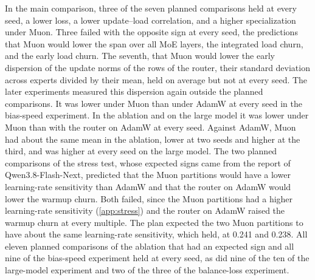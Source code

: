\documentclass[11pt, a4paper]{article}
\begin{document}
In the main comparison, three of the seven planned comparisons held at every seed, a lower loss, a lower update--load correlation, and a higher specialization under Muon. Three failed with the opposite sign at every seed, the predictions that Muon would lower the span over all MoE layers, the integrated load churn, and the early load churn. The seventh, that Muon would lower the early dispersion of the update norms of the rows of the router, their standard deviation across experts divided by their mean, held on average but not at every seed. The later experiments measured this dispersion again outside the planned comparisons. It was lower under Muon than under AdamW at every seed in the bias-speed experiment. In the ablation and on the large model it was lower under Muon than with the router on AdamW at every seed. Against AdamW, Muon had about the same mean in the ablation, lower at two seeds and higher at the third, and was higher at every seed on the large model. The two planned comparisons of the stress test, whose expected signs came from the report of Qwen3.8-Flash-Next, predicted that the Muon partitions would have a lower learning-rate sensitivity than AdamW and that the router on AdamW would lower the warmup churn. Both failed, since the Muon partitions had a higher learning-rate sensitivity (\cref{app:stress}) and the router on AdamW raised the warmup churn at every multiple. The plan expected the two Muon partitions to have about the same learning-rate sensitivity, which held, at 0.241 and 0.238. All eleven planned comparisons of the ablation that had an expected sign and all nine of the bias-speed experiment held at every seed, as did nine of the ten of the large-model experiment and two of the three of the balance-loss experiment.
\end{document}
